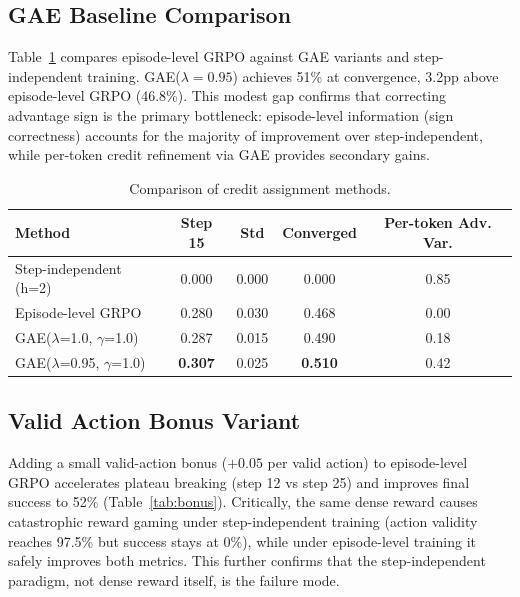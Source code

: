 \documentclass[11pt]{article}
\begin{document}
\subsection{GAE Baseline Comparison}

Table~\ref{tab:gae} compares episode-level GRPO against GAE variants and step-independent training. GAE($\lambda=0.95$) achieves 51\% at convergence, 3.2pp above episode-level GRPO (46.8\%). This modest gap confirms that correcting advantage sign is the primary bottleneck: episode-level information (sign correctness) accounts for the majority of improvement over step-independent, while per-token credit refinement via GAE provides secondary gains.

\begin{table}[h]
\centering
\caption{Comparison of credit assignment methods.}
\label{tab:gae}
\begin{tabular}{lcccc}
\toprule
Method & Step 15 & Std & Converged & Per-token Adv. Var. \\
\midrule
Step-independent (h=2) & 0.000 & 0.000 & 0.000 & 0.85 \\
Episode-level GRPO & 0.280 & 0.030 & 0.468 & 0.00 \\
GAE($\lambda$=1.0, $\gamma$=1.0) & 0.287 & 0.015 & 0.490 & 0.18 \\
GAE($\lambda$=0.95, $\gamma$=1.0) & \textbf{0.307} & 0.025 & \textbf{0.510} & 0.42 \\
\bottomrule
\end{tabular}
\end{table}

\subsection{Valid Action Bonus Variant}

Adding a small valid-action bonus ($+0.05$ per valid action) to episode-level GRPO accelerates plateau breaking (step 12 vs step 25) and improves final success to 52\% (Table~\ref{tab:bonus}). Critically, the same dense reward causes catastrophic reward gaming under step-independent training (action validity reaches 97.5\% but success stays at 0\%), while under episode-level training it safely improves both metrics. This further confirms that the step-independent paradigm, not dense reward itself, is the failure mode.
\end{document}
